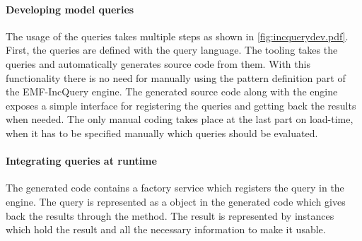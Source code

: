 \paragraph{Developing model queries}
The usage of the queries takes multiple steps as shown in \autoref{fig:incquerydev.pdf}.
First, the queries are defined with the query language. The tooling takes the queries 
and automatically generates source code from them. With this functionality there is no need 
for manually using the pattern definition part of the EMF-IncQuery engine. The generated
source code along with the engine exposes a simple interface for registering the
queries and getting back the results when needed. The only manual coding takes place
at the last part on load-time, when it has to be specified manually which queries 
should be evaluated. 

\paragraph{Integrating queries at runtime}  
The generated code contains a factory service which registers the query in the
engine. The query is represented as a  object in the generated
code which gives back the results through the 
method. The result is represented by  instances which hold the result 
and all the necessary information to make it usable.

